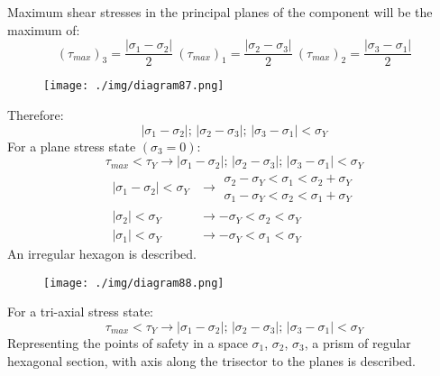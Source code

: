 Maximum shear stresses in the principal planes of the component will be the maximum of:
\begin{equation}
  \left(\tau_{max}\right)_3 = \frac{\left| \sigma_1 - \sigma_2 \right| }{2} \ \left(\tau_{max}\right)_1 = \frac{\left| \sigma_2 - \sigma_3 \right| }{2} \ \left(\tau_{max}\right)_2 = \frac{\left| \sigma_3 - \sigma_1 \right| }{2}
\end{equation}
\begin{figure}[H]
  \centering
  \texttt{[image: ./img/diagram87.png]}
  \caption{}
\end{figure}
Therefore:
\begin{equation}
  \left| \sigma_1 - \sigma_2 \right| ; \, \left| \sigma_2 - \sigma_3 \right| ; \, \left| \sigma_3 - \sigma_1 \right| < \sigma_Y
\end{equation}
For a plane stress state $\left(\sigma_3 = 0\right)$:
\begin{equation}
  \tau_{max} < \tau_Y \rightarrow \left| \sigma_1 - \sigma_2 \right| ; \, \left| \sigma_2 - \sigma_3 \right| ; \, \left| \sigma_3 - \sigma_1 \right| < \sigma_Y
\end{equation}
\begin{align}
  \left| \sigma_1 - \sigma_2 \right| < \sigma_Y & \rightarrow \begin{array}{l}
    \sigma_2 - \sigma_Y < \sigma_1 < \sigma_2 + \sigma_Y \\
    \sigma_1 - \sigma_Y < \sigma_2 < \sigma_1 + \sigma_Y
  \end{array}       \\
  \left| \sigma_2 \right| < \sigma_Y            & \rightarrow - \sigma_Y < \sigma_2 < \sigma_Y \\
  \left| \sigma_1 \right| < \sigma_Y            & \rightarrow - \sigma_Y < \sigma_1 < \sigma_Y
\end{align}
An irregular hexagon is described.
\begin{figure}[H]
  \centering
  \texttt{[image: ./img/diagram88.png]}
  \caption{}
\end{figure}
For a tri-axial stress state:
\begin{equation}
  \tau_{max} < \tau_Y \rightarrow \left| \sigma_1 - \sigma_2 \right| ; \, \left| \sigma_2 - \sigma_3 \right| ; \, \left| \sigma_3 - \sigma_1 \right| < \sigma_Y
\end{equation}
Representing the points of safety in a space $\sigma_1$, $\sigma_2$, $\sigma_3$, a prism of regular hexagonal section, with axis along the trisector to the planes is described.
